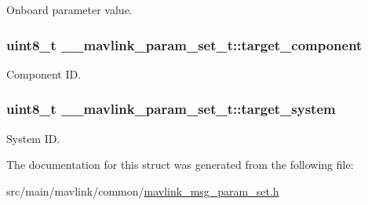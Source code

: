 Onboard parameter value. 

\hypertarget{struct____mavlink__param__set__t_ad1526f09aefc29226f2362a2a0963237}{
\subsubsection[{target\+\_\+component}]{\setlength{\rightskip}{0pt plus 5cm}uint8\+\_\+t \+\_\+\+\_\+mavlink\+\_\+param\+\_\+set\+\_\+t\+::target\+\_\+component}}\label{struct____mavlink__param__set__t_ad1526f09aefc29226f2362a2a0963237}


Component I\+D. 

\hypertarget{struct____mavlink__param__set__t_a501eee1b0a93fa7affad440d51bbab90}{
\subsubsection[{target\+\_\+system}]{\setlength{\rightskip}{0pt plus 5cm}uint8\+\_\+t \+\_\+\+\_\+mavlink\+\_\+param\+\_\+set\+\_\+t\+::target\+\_\+system}}\label{struct____mavlink__param__set__t_a501eee1b0a93fa7affad440d51bbab90}


System I\+D. 



The documentation for this struct was generated from the following file\+:\begin{DoxyCompactItemize}
\item 
src/main/mavlink/common/\hyperlink{mavlink__msg__param__set_8h}{mavlink\+\_\+msg\+\_\+param\+\_\+set.\+h}\end{DoxyCompactItemize}
